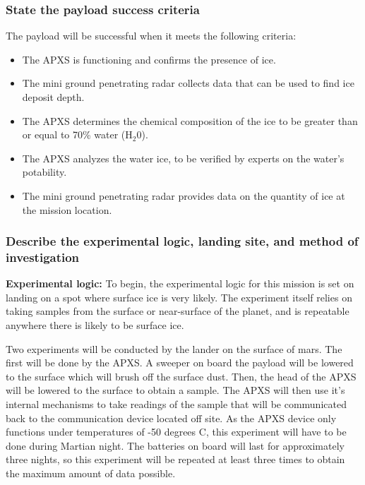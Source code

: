 \documentclass[%
 portrait,
 aapm,
 mph,%
 amsmath,amssymb,
 reprint,%
]{revtex4-2}
\begin{document}
\subsubsection{State the payload success criteria}
The payload will be successful when it meets the following criteria:
\begin{itemize}
    \item The APXS is functioning and confirms the presence of ice.
    \item The mini ground penetrating radar collects data that can be used to find ice deposit depth.
    \item The APXS determines the chemical composition of the ice to be greater than or equal to 70\% water (H\begin{math}_2\end{math}0).
    \item The APXS analyzes the water ice, to be verified by experts on the water's potability.
    \item The mini ground penetrating radar provides data on the quantity of ice at the mission location.
\end{itemize}

\subsubsection{Describe the experimental logic, landing site, and method of investigation}
\textbf{Experimental logic:} To begin, the experimental logic for this mission is set on landing on a spot where surface ice is very likely. The experiment itself relies on taking samples from the surface or near-surface of the planet, and is repeatable anywhere there is likely to be surface ice.

Two experiments will be conducted by the lander on the surface of mars. The first will be done by the APXS. A sweeper on board the payload will be lowered to the surface which will brush off the surface dust. Then, the head of the APXS will be lowered to the surface to obtain a sample. The APXS will then use it's internal mechanisms to take readings of the sample that will be communicated back to the communication device located off site. As the APXS device only functions under temperatures of -50 degrees C, this experiment will have to be done during Martian night. The batteries on board will last for approximately three nights, so this experiment will be repeated at least three times to obtain the maximum amount of data possible.
\end{document}
